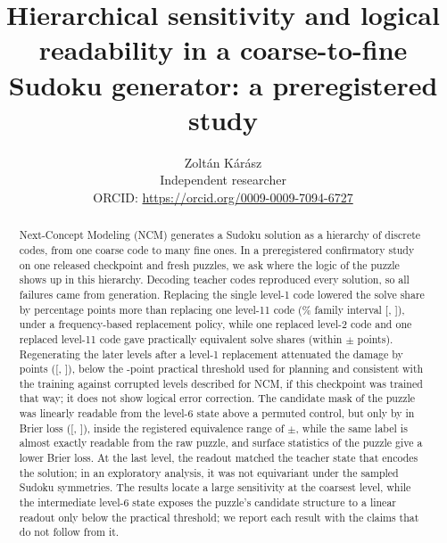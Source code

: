 \title{Hierarchical sensitivity and logical readability in a coarse-to-fine Sudoku generator: a preregistered study}
\author{Zolt\'an K\'ar\'asz\\ Independent researcher\\ {\small ORCID: \url{https://orcid.org/0009-0009-7094-6727}}}
\date{}


\maketitle

\begin{abstract}
Next-Concept Modeling (NCM) generates a Sudoku solution as a hierarchy of discrete codes, from one coarse code to many fine ones. In a preregistered confirmatory study on one released checkpoint and  fresh puzzles, we ask where the logic of the puzzle shows up in this hierarchy. Decoding teacher codes reproduced every solution, so all failures came from generation. Replacing the single level-1 code lowered the solve share by  percentage points more than replacing one level-11 code (\% family interval [, ]), under a frequency-based replacement policy, while one replaced level-2 code and one replaced level-11 code gave practically equivalent solve shares (within $\pm$ points). Regenerating the later levels after a level-1 replacement attenuated the damage by  points ([, ]), below the -point practical threshold used for planning and consistent with the training against corrupted levels described for NCM, if this checkpoint was trained that way; it does not show logical error correction. The candidate mask of the puzzle was linearly readable from the level-6 state above a permuted control, but only by  in Brier loss ([, ]), inside the registered equivalence range of $\pm$, while the same label is almost exactly readable from the raw puzzle, and surface statistics of the puzzle give a lower Brier loss. At the last level, the readout matched the teacher state that encodes the solution; in an exploratory analysis, it was not equivariant under the sampled Sudoku symmetries. The results locate a large sensitivity at the coarsest level, while the intermediate level-6 state exposes the puzzle's candidate structure to a linear readout only below the practical threshold; we report each result with the claims that do not follow from it.
\end{abstract}

